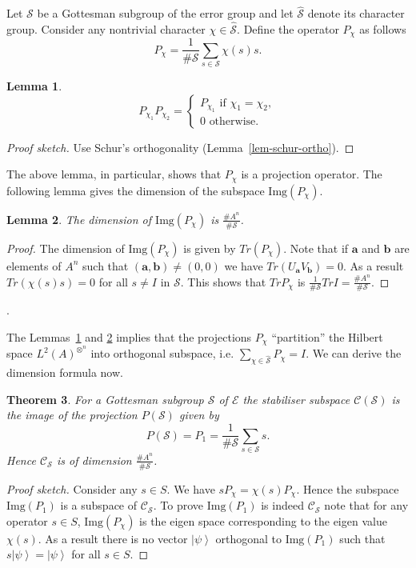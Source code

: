\documentclass[11pt,twoside]{article}
\newtheorem{theorem}{Theorem}[section]
\newtheorem{lemma}[theorem]{Lemma}
\theoremstyle{definition}
\theoremstyle{remark}
\newcommand{\ket}[1]{\ensuremath{\left\vert #1 \right\rangle}}
\newcommand{\LN}[1]{\ensuremath{L^2\left(#1\right)^{\otimes^n}}}
\begin{document}
Let $\mathcal{S}$ be a Gottesman subgroup of the error group and let
$\hat{\mathcal{S}}$ denote its character group.  Consider any
nontrivial character $\chi \in \hat{\mathcal{S}}$.  Define the
operator $P_{\chi}$ as follows
\[
P_\chi = \frac{1}{\# \mathcal{S}} \sum_{s \in \mathcal{S}} \chi(s) s.
\]

\begin{lemma}\label{lem-p-chi}
\[
P_{\chi_1} P_{\chi_2} = \left\{ \begin{array}{l}
    P_{\chi_1} \textrm{ if } \chi_1 = \chi_2,\\
    0 \textrm{ otherwise}.
  \end{array}
\right.
\]
\end{lemma}
\begin{proof}[Proof sketch]
  Use Schur's orthogonality (Lemma~\ref{lem-schur-ortho}).
\end{proof}

The above lemma, in particular, shows that $P_\chi$ is a projection
operator. The following lemma gives the dimension of the subspace
$\textrm{Img}(P_\chi)$.

\begin{lemma}\label{lem-dim-p-chi}
  The dimension of $\textrm{Img}(P_\chi)$ is $\frac{\# A^n}{\#
    \mathcal{S}}$.
\end{lemma}
\begin{proof}
  The dimension of $\textrm{Img}(P_\chi)$ is given by $Tr(P_\chi)$.
  Note that if $\mathbf{a}$ and $\mathbf{b}$ are elements of $A^n$
  such that $(\mathbf{a},\mathbf{b}) \neq (0,0)$ we have
  $Tr(U_\mathbf{a} V_\mathbf{b}) = 0$. As a result $Tr(\chi(s) s) = 0$
  for all $s \neq I$ in $\mathcal{S}$. This shows that $Tr{P_\chi}$ is
  $\frac{1}{\# \mathcal{S}} Tr{I} = \frac{\# A^n }{\# \mathcal{S}}$.
\end{proof}.
 
The Lemmas~\ref{lem-p-chi} and \ref{lem-dim-p-chi} implies that the
projections $P_\chi$ ``partition'' the Hilbert space $\LN{A}$ into
orthogonal subspace, i.e.  $\sum_{\chi \in \hat{\mathcal{S}}} P_\chi =
I$. We can derive the dimension formula now.

 
\begin{theorem}
  For a Gottesman subgroup $\mathcal{S}$ of $\mathcal{E}$ the
  stabiliser subspace $\mathcal{C}(\mathcal{S})$ is the image of the
  projection $P(\mathcal{S})$ given by
  \[
  P(\mathcal{S}) = P_1 = \frac{1}{\# \mathcal{S}} \sum_{s \in
    \mathcal{S}} s.
  \]
  Hence $\mathcal{C}_\mathcal{S}$ is of dimension $\frac{\#A^n}{\#
    \mathcal{S}}$.
\end{theorem}
\begin{proof}[Proof sketch]
  Consider any $s \in S$. We have $s P_\chi = \chi(s) P_\chi$. Hence
  the subspace $\textrm{Img}(P_1)$ is a subspace of
  $\mathcal{C}_\mathcal{S}$. To prove $\textrm{Img}(P_1)$ is indeed
  $\mathcal{C}_\mathcal{S}$ note that for any operator $s \in S$,
  $\textrm{Img}(P_\chi)$ is the eigen space corresponding to the eigen
  value $\chi(s)$. As a result there is no vector $\ket{\psi}$
  orthogonal to $\textrm{Img}(P_1)$ such that $s \ket{\psi} =
  \ket{\psi}$ for all $s \in S$.
\end{proof}
\end{document}
